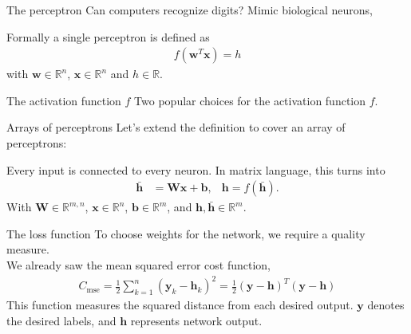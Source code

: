 \documentclass[notes]{beamer}
\begin{document}
    \begin{frame}{The perceptron}
      Can computers recognize digits? Mimic biological neurons,
      \begin{figure}
        
      \end{figure}
      Formally a single perceptron is defined as
      \begin{align}
        f(\mathbf{w}^T \mathbf{x}) = h
      \end{align}
      with $\mathbf{w} \in \mathbb{R}^n$, $\mathbf{x} \in \mathbb{R}^n$ and $h \in \mathbb{R}$. 
    \end{frame}

    \begin{frame}{The activation function $f$}
      Two popular choices for the activation function $f$.
      \begin{figure}
        
        
      \end{figure}
    \end{frame}

    \begin{frame}{Arrays of perceptrons}
      Let's extend the definition to cover an array of perceptrons:
      \begin{figure}
        
      \end{figure}
      Every input is connected to every neuron. In matrix language, this turns into
      \begin{align}
        \bar{\mathbf{h}} &= \mathbf{W}\mathbf{x} + \mathbf{b}, & \mathbf{h} = f(\bar{\mathbf{h}}).
      \end{align}
      With $\mathbf{W} \in \mathbb{R}^{m,n}$, $\mathbf{x} \in \mathbb{R}^{n}$, $\mathbf{b} \in \mathbb{R}^{m}$, and $\mathbf{h}, \bar{\mathbf{h}} \in \mathbb{R}^m$.
    \end{frame}

    \begin{frame}{The loss function}
      To choose weights for the network, we require a quality measure. \\
      We already saw the mean squared error cost function,
      \begin{align}
        C_{\text{mse}} = \frac{1}{2} \sum_{k=1}^{n} (\mathbf{y}_k - \mathbf{h}_k)^2 = \frac{1}{2} (\mathbf{y} - \mathbf{h})^T(\mathbf{y} - \mathbf{h})
      \end{align}
      This function measures the squared distance from each desired output.
      $\mathbf{y}$ denotes the desired labels, and $\mathbf{h}$ represents network output.
    \end{frame}
\end{document}

